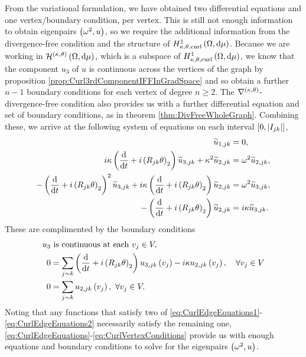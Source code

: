 From the variational formulation, we have obtained two differential equations and one vertex/boundary condition, per vertex.
This is still not enough information to obtain eigenpairs $\left( \omega^2, u \right)$, so we require the additional information from the divergence-free condition and the structure of $H^1_{\kappa,\theta,\mathrm{curl}}\left( \Omega, \mathrm{d}\mu \right)$.
Because we are working in $\mathcal{H}^{\left( \kappa, \theta \right)}\left( \Omega, \mathrm{d}\mu \right)$, which is a subspace of $H^1_{\kappa,\theta,\mathrm{curl}}\left( \Omega, \mathrm{d}\mu \right)$, we know that the component $u_3$ of $u$ is continuous across the vertices of the graph by proposition \ref{prop:Curl3rdComponentIFFInGradSpace} and so obtain a further $n-1$ boundary conditions for each vertex of degree $n\geq2$.
The $\nabla^{\left( \kappa, \theta \right)}$-divergence-free condition also provides us with a further differential equation and set of boundary conditions, as in theorem \ref{thm:DivFreeWholeGraph}.
Combining these, we arrive at the following system of equations on each interval $\left[ 0,\left\lvert I_{jk} \right\rvert \right]$,
\begin{subequations} \label{eq:CurlEdgeEquations}
	\begin{align}
		\widetilde{u}_{1,jk} &= 0, \\
		i\kappa\left( \dfrac{\mathrm{d}}{\mathrm{d}t} + i\left( R_{jk}\theta \right)_2 \right)\widetilde{u}_{3,jk} + \kappa^2\widetilde{u}_{2,jk} &= \omega^2 \widetilde{u}_{2,jk}, \label{eq:CurlEdgeEquations1} \\
		-\left( \dfrac{\mathrm{d}}{\mathrm{d}t} + i\left( R_{jk}\theta \right)_2 \right)^2\widetilde{u}_{3,jk} + i\kappa\left( \dfrac{\mathrm{d}}{\mathrm{d}t} + i\left( R_{jk}\theta \right)_2 \right)\widetilde{u}_{2,jk} &= \omega^2\widetilde{u}_{3,jk}, \label{eq:CurlEdgeEquations2} \\
		-\left( \dfrac{\mathrm{d}}{\mathrm{d}t} + i\left( R_{jk}\theta \right)_2 \right)\widetilde{u}_{2,jk} &= i\kappa\widetilde{u}_{3,jk}. \label{eq:CurlEdgeEquations3}
	\end{align}
\end{subequations}
These are complimented by the boundary conditions
\begin{subequations} \label{eq:CurlVertexConditions}
	\begin{align}
		u_3 &\text{ is continuous at each } v_j\in V, \label{eq:CurlVertexConditionsCty}\\
		0 &= \sum_{j\sim k} \left( \dfrac{\mathrm{d}}{\mathrm{d}t} + i\left( R_{jk}\theta \right)_2 \right)u_{3,jk}\left( v_j \right) - i\kappa u_{2,jk}\left( v_j \right), \quad\forall v_j\in V \label{eq:CurlVertexConditionsSumDeriv}\\
		0 &= \sum_{j\sim k}u_{2,jk}\left( v_j \right), \ \forall v_j\in V. \label{eq:CurlVertexConditionsSum2}
	\end{align}
\end{subequations}
Noting that any functions that satisfy two of \eqref{eq:CurlEdgeEquations1}-\eqref{eq:CurlEdgeEquations2} necessarily satisfy the remaining one, \eqref{eq:CurlEdgeEquations}-\eqref{eq:CurlVertexConditions} provide us with enough equations and boundary conditions to solve for the eigenpairs $\left( \omega^2, u \right)$.

